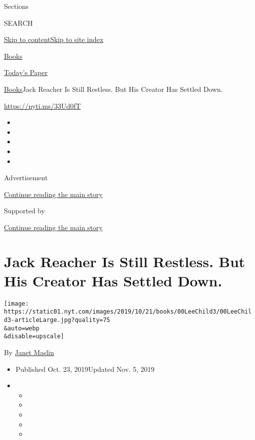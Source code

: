 Sections

SEARCH

\protect\hyperlink{site-content}{Skip to
content}\protect\hyperlink{site-index}{Skip to site index}

\href{https://www.nytimes.com/section/books}{Books}

\href{https://myaccount.nytimes.com/auth/login?response_type=cookie\&client_id=vi}{}

\href{https://www.nytimes.com/section/todayspaper}{Today's Paper}

\href{/section/books}{Books}\textbar{}Jack Reacher Is Still Restless.
But His Creator Has Settled Down.

\url{https://nyti.ms/33Ud0fT}

\begin{itemize}
\item
\item
\item
\item
\item
\end{itemize}

Advertisement

\protect\hyperlink{after-top}{Continue reading the main story}

Supported by

\protect\hyperlink{after-sponsor}{Continue reading the main story}

\hypertarget{jack-reacher-is-still-restless-but-his-creator-has-settled-down}{%
\section{Jack Reacher Is Still Restless. But His Creator Has Settled
Down.}\label{jack-reacher-is-still-restless-but-his-creator-has-settled-down}}

\texttt{[image: https://static01.nyt.com/images/2019/10/21/books/00LeeChild3/00LeeChild3-articleLarge.jpg?quality=75\\\&auto=webp\\\&disable=upscale]}

By \href{https://www.nytimes.com/by/janet-maslin}{Janet Maslin}

\begin{itemize}
\item
  Published Oct. 23, 2019Updated Nov. 5, 2019
\item
  \begin{itemize}
  \item
  \item
  \item
  \item
  \item
  \end{itemize}
\end{itemize}

